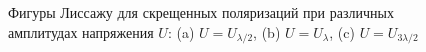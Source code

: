 \documentclass[a4paper, 12pt]{article}
\begin{document}
\begin{figure}[h]
\begin{minipage}[h]{0.3\linewidth}
		\end{minipage}
		\caption{Фигуры Лиссажу для скрещенных поляризаций при различных амплитудах напряжения $U$: (a) $U = U_{\lambda/2}$, (b) $U = U_{\lambda}$, (c) $U = U_{3\lambda/2}$ }
		\label{lis}
	\end{figure}
 
 
\end{document}
